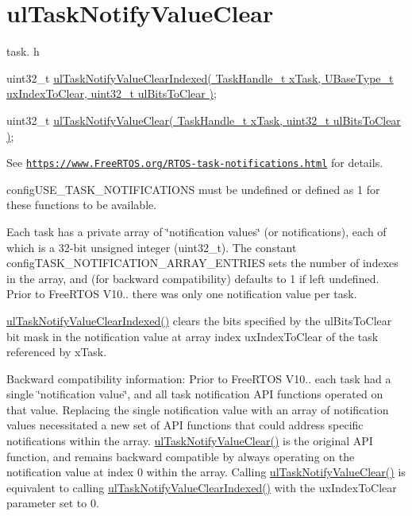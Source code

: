 \hypertarget{group__ul_task_notify_value_clear}{}\section{ul\+Task\+Notify\+Value\+Clear}
\label{group__ul_task_notify_value_clear}
task. h 
\begin{DoxyPre}
uint32\_t \hyperlink{externals_2freertos_2include_2task_8h_a2ddeedf4178bc20d8eb2addd461cdc49}{ulTaskNotifyValueClearIndexed( TaskHandle\_t xTask, UBaseType\_t uxIndexToClear, uint32\_t ulBitsToClear )};\end{DoxyPre}



\begin{DoxyPre}uint32\_t \hyperlink{externals_2freertos_2include_2task_8h_a3b7cf88f6c77b78a01fcf4b0d624d573}{ulTaskNotifyValueClear( TaskHandle\_t xTask, uint32\_t ulBitsToClear )};
\end{DoxyPre}


See \href{https://www.FreeRTOS.org/RTOS-task-notifications.html}{\tt https\+://www.\+Free\+R\+T\+O\+S.\+org/\+R\+T\+O\+S-\/task-\/notifications.\+html} for details.

config\+U\+S\+E\+\_\+\+T\+A\+S\+K\+\_\+\+N\+O\+T\+I\+F\+I\+C\+A\+T\+I\+O\+NS must be undefined or defined as 1 for these functions to be available.

Each task has a private array of \char`\"{}notification values\char`\"{} (or \textquotesingle{}notifications\textquotesingle{}), each of which is a 32-\/bit unsigned integer (uint32\+\_\+t). The constant config\+T\+A\+S\+K\+\_\+\+N\+O\+T\+I\+F\+I\+C\+A\+T\+I\+O\+N\+\_\+\+A\+R\+R\+A\+Y\+\_\+\+E\+N\+T\+R\+I\+ES sets the number of indexes in the array, and (for backward compatibility) defaults to 1 if left undefined. Prior to Free\+R\+T\+OS V10.. there was only one notification value per task.

\hyperlink{externals_2freertos_2include_2task_8h_a2ddeedf4178bc20d8eb2addd461cdc49}{ul\+Task\+Notify\+Value\+Clear\+Indexed()} clears the bits specified by the ul\+Bits\+To\+Clear bit mask in the notification value at array index ux\+Index\+To\+Clear of the task referenced by x\+Task.

Backward compatibility information\+: Prior to Free\+R\+T\+OS V10.. each task had a single \char`\"{}notification value\char`\"{}, and all task notification A\+PI functions operated on that value. Replacing the single notification value with an array of notification values necessitated a new set of A\+PI functions that could address specific notifications within the array. \hyperlink{externals_2freertos_2include_2task_8h_a3b7cf88f6c77b78a01fcf4b0d624d573}{ul\+Task\+Notify\+Value\+Clear()} is the original A\+PI function, and remains backward compatible by always operating on the notification value at index 0 within the array. Calling \hyperlink{externals_2freertos_2include_2task_8h_a3b7cf88f6c77b78a01fcf4b0d624d573}{ul\+Task\+Notify\+Value\+Clear()} is equivalent to calling \hyperlink{externals_2freertos_2include_2task_8h_a2ddeedf4178bc20d8eb2addd461cdc49}{ul\+Task\+Notify\+Value\+Clear\+Indexed()} with the ux\+Index\+To\+Clear parameter set to 0.


